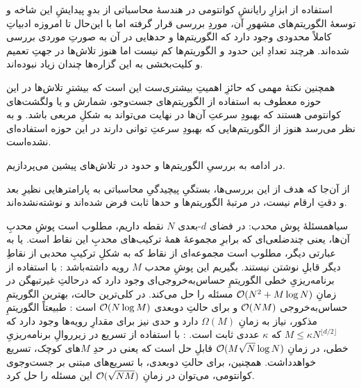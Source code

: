 

استفاده از ابزارِ رایانشِ کوانتومی در هندسهٔ محاسباتی از بدوِ پیدایشِ این شاخه و توسعهٔ الگوریتم‌های مشهورِ آن، موردِ بررسی قرار گرفته  اما با این‌حال تا امروزه ادبیاتِ کاملاً محدودی وجود دارد که الگوریتم‌ها و حدهایی در آن به صورتِ‌ موردی بررسی شده‌اند. هرچند تعدادِ این حدود و الگوریتم‌ها کم نیست اما هنوز تلاش‌ها در جهتِ تعمیم و کلیت‌بخشی به این گزاره‌ها چندان زیاد نبوده‌اند.

همچنین نکتهٔ مهمی که حائزِ اهمیتِ بیشتری‌ست این است که بیشترِ تلاش‌ها در این حوزه معطوف به استفاده از الگوریتم‌های جست‌وجو، شمارش و یا ولگشت‌های کوانتومی هستند که بهبودِ سرعتِ آن‌ها در نهایت می‌تواند به شکلِ مربعی باشد. و به نظر می‌رسد هنوز از الگوریتم‌هایی که بهبودِ سرعتِ توانی
 دارند در این حوزه استفاده‌ای نشده‌است. 

در ادامه به بررسیِ الگوریتم‌ها و حدود در تلاش‌های پیشین می‌پردازیم.

از آن‌جا که هدف از این بررسی‌ها، بستگیِ پیچیدگیِ محاسباتی به پارامترهایی نظیرِ بعد و دقتِ ارقام نیست، در مرتبهٔ الگوریتم‌ها و حدها ثابت فرض شده‌اند و نوشته‌نشده‌اند.


    ‌سیاه{مسئلهٔ پوش محدب}: در فضای $d$-بعدی $N$ نقطه داریم، مطلوب است پوشِ محدبِ آن‌ها، یعنی چندضلعی‌ای که برابرِ مجموعهٔ همهٔ ترکیب‌های محدبِ این نقاط است. یا به عبارتی دیگر، مطلوب است مجموعه‌ای از نقاط که به شکلِ ترکیبِ محدبی از نقاطِ دیگر قابلِ نوشتن نیستند. بگیریم این پوشِ محدب $M$ رویه داشته‌باشد 
        : با استفاده از برنامه‌ریزیِ خطی الگوریتمِ حساس‌به‌خروجی‌ای وجود دارد که درحالتِ غیرتبهگن
        در زمانِ
        $\mathcal{O}(N^2 + M\log N)$
        مسئله را حل می‌کند. در کلی‌ترین حالت، بهترین الگوریتمِ حساس‌به‌خروجی 
        $\mathcal{O}(NM)$
        و برای حالتِ دوبعدی 
        $\mathcal{O}(N \log M)$
        است
        : طبیعتاً الگوریتمِ مذکور، نیاز به زمانِ 
        $\Omega(M)$
        دارد و حدی نیز برای مقدارِ رویه‌ها وجود دارد که
        $M \le \kappa N^{\lfloor d/2 \rfloor}$
        که $\kappa$ عددی ثابت است.
        : با استفاده از تسریع در زیرروالِ برنامه‌ریزیِ خطی، در زمانِ
        $\mathcal{O}(M \sqrt{N} \log N)$
        قابلِ حل است که یعنی در حدِ $M$های کوچک، تسریع خواهدداشت.
        همچنین، برای حالتِ دوبعدی، با تسریع‌های مبتنی بر جست‌وجوی کوانتومی، می‌توان در زمانِ
        $\mathcal{O}(\sqrt{NM})$
        این مسئله را حل کرد.

